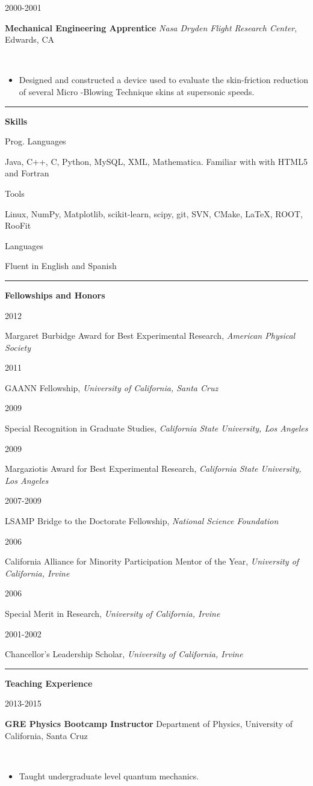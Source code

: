 \documentclass[11pt]{article}
\newcommand{\cvsection}[1] {
    \noindent
    \textcolor{indigodye}{\rule{.15\textwidth}{.1in} \hspace{0.01 \textwidth} \textbf{\Large{#1}}} \newline 
}
\newcommand{\experienceentry}[5] { 
    \noindent
    \begin{minipage}[t]{0.15\textwidth} \begin{flushright} #1 \end{flushright} \end{minipage} \hspace{0.01\textwidth}
    \begin{minipage}[t]{0.84\textwidth} 
        \textbf{#2} \newline
        \emph{#3}, #4 
    \end{minipage} \\[0.01pt]
    #5 \vspace{11pt}
}
\newcommand{\skillsentry}[2] { 
    \noindent
    \begin{minipage}[t]{0.15\textwidth} \begin{flushright} #1 \end{flushright} \end{minipage} \hspace{0.01\textwidth}
    \begin{minipage}[t]{0.84\textwidth} #2 \end{minipage}
}
\newcommand{\awardentry}[3] { 
    \noindent
    \begin{minipage}[t]{0.15\textwidth} \begin{flushright} #1 \end{flushright} \end{minipage} \hspace{0.01\textwidth}
    \begin{minipage}[t]{0.84\textwidth} #2,  \emph{#3} 
    \end{minipage}
}
\newcommand{\teachingentry}[4] { 
    \noindent
    \begin{minipage}[t]{0.15\textwidth} \begin{flushright} #1 \end{flushright} \end{minipage} \hspace{0.01\textwidth}
    \begin{minipage}[t]{0.84\textwidth}
        \textbf{#2} \newline
        #3  
    \end{minipage} \\[0.01pt]
    #4 \vspace{11pt}
}
\begin{document}
        \experienceentry{2000-2001}
                        {Mechanical Engineering Apprentice}
                        {Nasa Dryden Flight Research Center}
                        {Edwards, CA}
                        {
                            \begin{itemize}[label=\textcolor{indigodye}{$\circ$}, noitemsep, nolistsep, leftmargin=0.19\textwidth]
                                \item Designed and constructed a device used to evaluate the skin-friction reduction 
                                      of several Micro -Blowing Technique skins at supersonic speeds. 
                            \end{itemize}
                        } 
    
    \cvsection{Skills}
        \skillsentry{Prog. Languages}{Java, C++, C, Python, MySQL, XML, Mathematica. Familiar with with HTML5 and Fortran}
        \skillsentry{Tools}{Linux, NumPy, Matplotlib, scikit-learn, scipy, git, SVN, CMake, \LaTeX, ROOT, RooFit}
        \skillsentry{Languages}{Fluent in English and Spanish}

    \cvsection{Fellowships and Honors}
        \awardentry{2012}{Margaret Burbidge Award for Best Experimental Research}{American Physical Society} 
        \awardentry{2011}{GAANN Fellowship}{University of California, Santa Cruz}
        \awardentry{2009}{Special Recognition in Graduate Studies}
                         {California State University, Los Angeles}
        \awardentry{2009}{Margaziotis Award for Best Experimental Research}
                         {California State University, Los Angeles}
        \awardentry{2007-2009}{LSAMP Bridge to the Doctorate Fellowship}
                              {National Science Foundation} 
        \awardentry{2006}{California Alliance for Minority Participation Mentor of the Year}
                         {University of California, Irvine}
        \awardentry{2006}{Special Merit in Research}
                         {University of California, Irvine}
        \awardentry{2001-2002}{Chancellor's Leadership Scholar}
                         {University of California, Irvine}

    \cvsection{Teaching Experience}
        \teachingentry{2013-2015}{GRE Physics Bootcamp Instructor}
                      {Department of Physics, University of California, Santa Cruz}
                      {
                        \begin{itemize}[label=\textcolor{indigodye}{$\circ$}, noitemsep, nolistsep, leftmargin=0.19\textwidth]
                            \item Taught undergraduate level quantum mechanics.                                 
                          \end{itemize}
                      }
\end{document}
